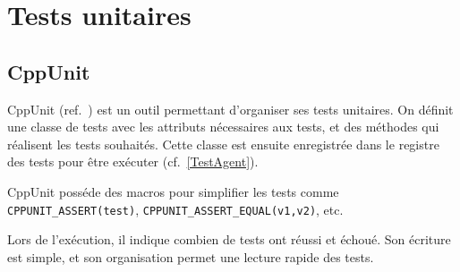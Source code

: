 \section{Tests unitaires}
\subsection{CppUnit}
CppUnit (ref.~\cite{CppUnit}) est un outil permettant d'organiser ses tests unitaires.
 On définit une classe de tests avec les attributs nécessaires aux tests, et des méthodes qui réalisent les tests souhaités. Cette classe est ensuite enregistrée dans le registre des tests pour être exécuter (cf.~\ref{TestAgent}).

CppUnit posséde des macros pour simplifier les tests comme \verb|CPPUNIT_ASSERT(test)|, \verb|CPPUNIT_ASSERT_EQUAL(v1,v2)|, etc.

Lors de l'exécution, il indique combien de tests ont réussi et échoué.
Son écriture est simple, et son organisation permet une lecture rapide des tests.


